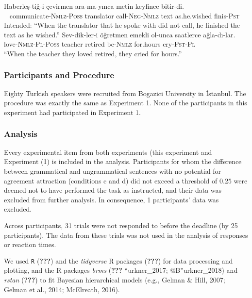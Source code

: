 \documentclass[english,doc]{apa6}
\begin{document}
\begin{exe}
\ex
\begin{xlist}
\ex \label{filler1a}
\gll * Haberleş-tiğ-i çevirmen ara-ma-yınca metin keyfince bitir-di.\\
{\ } communicate-\textsc{Nmlz}-\textsc{Poss} translator call-\textsc{Neg}-\textsc{Nmlz} text as.he.wished finis-\textsc{Pst}\\
\glt Intended: ``When the translator that he spoke with did not call, he finished the text as he wished.''
\ex \label{filler1b}
\gll Sev-dik-ler-i öğretmen emekli ol-unca saatlerce ağla-dı-lar.\\
love-\textsc{Nmlz}-\textsc{Pl}-\textsc{Poss} teacher retired be-\textsc{Nmlz} for.hours cry-\textsc{Pst}-\textsc{Pl}\\
\glt ``When the teacher they loved retired, they cried for hours.''
\end{xlist}
\end{exe}

\hypertarget{participants-and-procedure-1}{%
\subsubsection{Participants and Procedure}\label{participants-and-procedure-1}}

Eighty Turkish speakers were recruited from Bogazici University in İstanbul. The procedure was exactly the same as Experiment 1. None of the participants in this experiment had participated in Experiment 1.

\hypertarget{analysis}{%
\subsubsection{Analysis}\label{analysis}}

Every experimental item from both experiments (this experiment and Experiment (1) is included in the analysis.
Participants for whom the difference between grammatical and ungrammatical sentences with no potential for agreement attraction (conditions c and d) did not exceed a threshold of \(0.25\) were deemed not to have performed the task as instructed, and their data was excluded from further analysis. In consequence, 1 participants' data was excluded.

Across participants, 31 trials were not responded to before the deadline (by 25 participants). The data from these trials was not used in the analysis of responses or reaction times.

We used \texttt{R} ({\textbf{???}}) and the \emph{tidyverse} R packages ({\textbf{???}}) for data processing and plotting, and the R packages \emph{brms} ({\textbf{???}} ``urkner\_2017; @B''urkner\_2018) and \emph{rstan} ({\textbf{???}}) to fit Bayesian hierarchical models (e.g., Gelman \& Hill, 2007; Gelman et al., 2014; McElreath, 2016).
\end{document}
